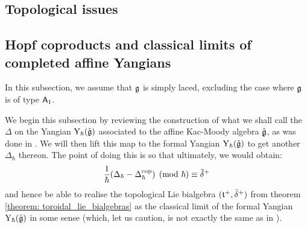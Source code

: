     \subsection{Topological issues}
    
    \subsection{Hopf coproducts and classical limits of completed affine Yangians}
        \begin{convention}
            In this subsection, we assume that $\mathfrak{g}$ is simply laced, excluding the case where $\mathfrak{g}$ is of type $\mathsf{A}_1$. 
        \end{convention}

        We begin this subsection by reviewing the construction of what we shall call the  $\Delta$ on the Yangian $\mathrm{Y}_{\hbar}(\hat{\mathfrak{g}})$ associated to the affine Kac-Moody algebra $\hat{\mathfrak{g}}$, as was done in \cite[Sections 4 and 5]{guay_nakajima_wendlandt_affine_yangian_coproduct}. We will then lift this map to the formal Yangian $\mathrm{Y}_{\hbar}(\hat{\mathfrak{g}})$ to get another  $\Delta_{\hbar}$ thereon. The point of doing this is so that ultimately, we would obtain:
            $$\frac{1}{\hbar}(\Delta_{\hbar} - \Delta_{\hbar}^{\mathrm{cop}}) \pmod{\hbar} \equiv \tilde{\delta}^{+}$$
        and hence be able to realise the topological Lie bialgebra $(\mathfrak{t}^{+}, \tilde{\delta}^{+})$ from theorem \ref{theorem: toroidal_lie_bialgebras} as the classical limit of the formal Yangian $\mathrm{Y}_{\hbar}(\hat{\mathfrak{g}})$ in some sense (which, let us caution, is not exactly the same as in \cite{etingof_kazhdan_quantisation_1}).
        

